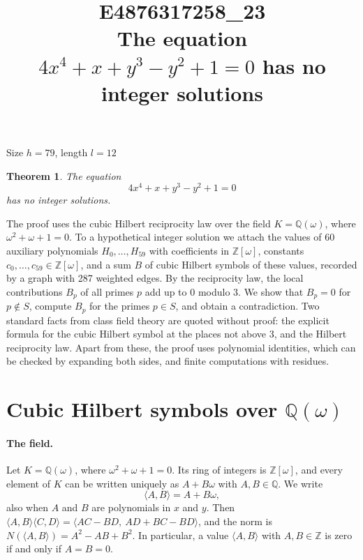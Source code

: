 \documentclass[11pt]{article}
\title{\textbf{E4876317258\_23}\\[4pt] {\Large The equation $4x^{4}+x+y^{3}-y^{2}+1=0$ has no integer solutions}}
\author{}
\date{}
\newtheorem{theorem}{Theorem}
\newcommand{\Z}{\mathbb{Z}}
\newcommand{\Q}{\mathbb{Q}}
\begin{document}
\maketitle
\vspace{-8ex}
\begin{center}
Size $h=79$, length $l=12$
\end{center}

\begin{theorem}\label{thm:main}
The equation
\begin{equation}\label{eq:main}
4x^{4}+x+y^{3}-y^{2}+1=0
\end{equation}
has no integer solutions.
\end{theorem}

The proof uses the cubic Hilbert reciprocity law over the field $K=\Q(\omega)$, where $\omega^2+\omega+1=0$. To a hypothetical integer solution we attach the values of 60 auxiliary polynomials $H_0,\dots,H_{59}$ with coefficients in $\Z[\omega]$, constants $c_0,\dots,c_{59}\in\Z[\omega]$, and a sum $B$ of cubic Hilbert symbols of these values, recorded by a graph with 287 weighted edges. By the reciprocity law, the local contributions $B_p$ of all primes $p$ add up to $0$ modulo $3$. We show that $B_p=0$ for $p\notin S$, compute $B_p$ for the primes $p\in S$, and obtain a contradiction. Two standard facts from class field theory are quoted without proof: the explicit formula for the cubic Hilbert symbol at the places not above $3$, and the Hilbert reciprocity law. Apart from these, the proof uses polynomial identities, which can be checked by expanding both sides, and finite computations with residues.


\section{\texorpdfstring{Cubic Hilbert symbols over $\Q(\omega)$}{Cubic Hilbert symbols over Q(w)}}\label{sec:symbols}

\paragraph{The field.} Let $K=\Q(\omega)$, where $\omega^2+\omega+1=0$. Its ring of integers is $\Z[\omega]$, and every element of $K$ can be written uniquely as $A+B\omega$ with $A,B\in\Q$. We write
\[
\langle A,B\rangle=A+B\omega,
\]
also when $A$ and $B$ are polynomials in $x$ and $y$. Then $\langle A,B\rangle\langle C,D\rangle=\langle AC-BD,\ AD+BC-BD\rangle$, and the norm is $N(\langle A,B\rangle)=A^2-AB+B^2$. In particular, a value $\langle A,B\rangle$ with $A,B\in\Z$ is zero if and only if $A=B=0$.
\end{document}
